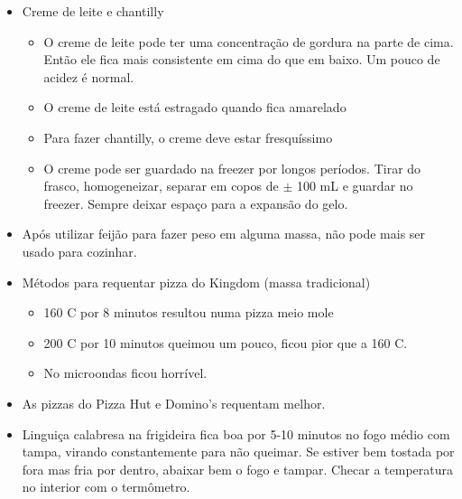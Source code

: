 \begin{itemize}
	\item Creme de leite e chantilly
	      \begin{itemize}
		      \item O creme de leite pode ter uma concentração de gordura na parte de cima.
		            Então ele fica mais consistente em cima do que em baixo. Um pouco de acidez
		            é normal.
		      \item O creme de leite está estragado quando fica amarelado
		      \item Para fazer chantilly, o creme deve estar fresquíssimo
		      \item O creme pode ser guardado na freezer por longos períodos. Tirar do
		            frasco, homogeneizar, separar em copos de $\pm$ 100 mL e guardar no freezer.
		            Sempre deixar espaço para a expansão do gelo.
	      \end{itemize}

	\item Após utilizar feijão para fazer peso em alguma massa, não pode mais ser
	      usado para cozinhar.
  \item Métodos para requentar pizza do Kingdom (massa tradicional)
    \begin{itemize}
    \item 160 \grau C por 8 minutos resultou numa pizza meio mole
    \item 200 \grau C por 10 minutos queimou um pouco, ficou pior que a 160
      \grau C.
    \item No microondas ficou horrível.
    \end{itemize}
  \item As pizzas do Pizza Hut e Domino's requentam melhor.
  \item Linguiça calabresa na frigideira fica boa por 5-10 minutos no fogo médio
    com tampa, virando constantemente para não queimar. Se estiver bem tostada
    por fora mas fria por dentro, abaixar bem o fogo e tampar. Checar a
    temperatura no interior com o termômetro.
\end{itemize}

